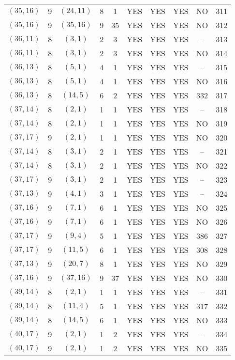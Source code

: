 \begin{longtable}{|c|c|c|c|c|c|c|c|c|c|}
$(35, 16)$ & 9 & $(24, 11)$ & 8 & 1 & YES & YES & YES & NO & 311\\
$(35, 16)$ & 9 & $(35, 16)$ & 9 & 35 & YES & YES & YES & NO & 312\\
$(36, 11)$ & 8 & $(3, 1)$ & 2 & 3 & YES & YES & YES & -- & 313\\
$(36, 11)$ & 8 & $(3, 1)$ & 2 & 3 & YES & YES & YES & NO & 314\\
$(36, 13)$ & 8 & $(5, 1)$ & 4 & 1 & YES & YES & YES & -- & 315\\
$(36, 13)$ & 8 & $(5, 1)$ & 4 & 1 & YES & YES & YES & NO & 316\\
$(36, 13)$ & 8 & $(14, 5)$ & 6 & 2 & YES & YES & YES & 332 & 317\\
$(37, 14)$ & 8 & $(2, 1)$ & 1 & 1 & YES & YES & YES & -- & 318\\
$(37, 14)$ & 8 & $(2, 1)$ & 1 & 1 & YES & YES & YES & NO & 319\\
$(37, 17)$ & 9 & $(2, 1)$ & 1 & 1 & YES & YES & YES & NO & 320\\
$(37, 14)$ & 8 & $(3, 1)$ & 2 & 1 & YES & YES & YES & -- & 321\\
$(37, 14)$ & 8 & $(3, 1)$ & 2 & 1 & YES & YES & YES & NO & 322\\
$(37, 17)$ & 9 & $(3, 1)$ & 2 & 1 & YES & YES & YES & -- & 323\\
$(37, 13)$ & 9 & $(4, 1)$ & 3 & 1 & YES & YES & YES & -- & 324\\
$(37, 16)$ & 9 & $(7, 1)$ & 6 & 1 & YES & YES & YES & NO & 325\\
$(37, 16)$ & 9 & $(7, 1)$ & 6 & 1 & YES & YES & YES & NO & 326\\
$(37, 17)$ & 9 & $(9, 4)$ & 5 & 1 & YES & YES & YES & 386 & 327\\
$(37, 17)$ & 9 & $(11, 5)$ & 6 & 1 & YES & YES & YES & 308 & 328\\
$(37, 13)$ & 9 & $(20, 7)$ & 8 & 1 & YES & YES & YES & NO & 329\\
$(37, 16)$ & 9 & $(37, 16)$ & 9 & 37 & YES & YES & YES & NO & 330\\
$(39, 14)$ & 8 & $(2, 1)$ & 1 & 1 & YES & YES & YES & -- & 331\\
$(39, 14)$ & 8 & $(11, 4)$ & 5 & 1 & YES & YES & YES & 317 & 332\\
$(39, 14)$ & 8 & $(14, 5)$ & 6 & 1 & YES & YES & YES & NO & 333\\
$(40, 17)$ & 9 & $(2, 1)$ & 1 & 2 & YES & YES & YES & -- & 334\\
$(40, 17)$ & 9 & $(2, 1)$ & 1 & 2 & YES & YES & YES & NO & 335\\

\end{longtable}
